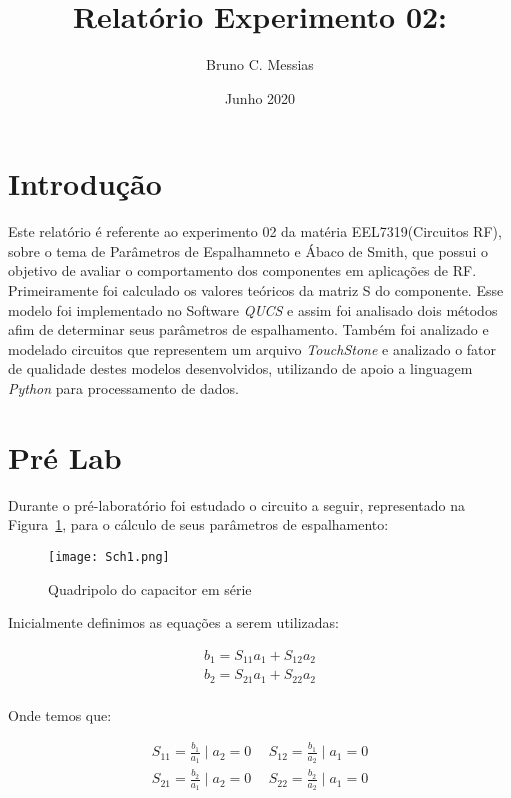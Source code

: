 \documentclass[a4paper,12pt]{proc}
\title{Relatório Experimento 02:}
\author{Bruno C. Messias}
\date{Junho 2020}
\begin{document}
\maketitle

\section{Introdução}

Este relatório é referente ao experimento 02 da matéria EEL7319(Circuitos RF), sobre o tema de Parâmetros de Espalhamneto e Ábaco de Smith, que possui o objetivo de avaliar o comportamento dos componentes em aplicações de RF.
Primeiramente foi  calculado os valores teóricos da matriz S do componente.
Esse modelo foi implementado no Software \textit{QUCS} e assim foi analisado dois métodos afim de determinar seus parâmetros de espalhamento. Também foi analizado e modelado circuitos que representem um arquivo \textit{TouchStone} e analizado o fator de qualidade destes modelos desenvolvidos, utilizando de apoio a linguagem \textit{Python} para processamento de dados.

\section{Pré Lab}

Durante o pré-laboratório foi estudado o circuito a seguir, representado na Figura~\ref{sch1}, para o cálculo de seus parâmetros de espalhamento:

\begin{figure}[htbp]
    \centering
    \texttt{[image: Sch1.png]}
    \caption{Quadripolo do capacitor em série}
    \label{sch1}
\end{figure}

Inicialmente definimos as equações a serem utilizadas:

\begin{align*}
    b_{1} = S_{11}a_{1} + S_{12}a_{2}\\             
    b_{2} = S_{21}a_{1} + S_{22}a_{2}\\
\end{align*}

Onde temos que:

\begin{align*}
    S_{11} = \frac{b_{1}}{a_{1}}\mid a_{2} = 0~~         &  S_{12} = \frac{b_{1}}{a_{2}}\mid a_{1} = 0\\             
    S_{21} = \frac{b_{2}}{a_{1}}\mid a_{2} = 0~~         &  S_{22} = \frac{b_{2}}{a_{2}}\mid a_{1} = 0\\
\end{align*}
\end{document}
